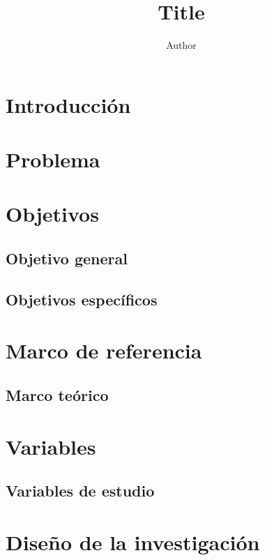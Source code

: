 \documentclass[stu,12pt,letterpaper,a4paper,donotrepeattitle]{apa7}
\title{Title}
\author{Author}
\affiliation{}
\begin{document}
\thispagestyle{empty}
\maketitle

\tableofcontents
\setcounter{page}{1}
\newpage

\section{Introducci\'on}

\newpage

\section{Problema}

\newpage

\section{Objetivos}
\subsection{Objetivo general}
\subsection{Objetivos espec\'ificos}

\newpage

\section{Marco de referencia}
\subsection{Marco te\'orico}

\newpage

\section{Variables}
\subsection{Variables de estudio}

\newpage

\section{Dise\~no de la investigaci\'on}
\end{document}
